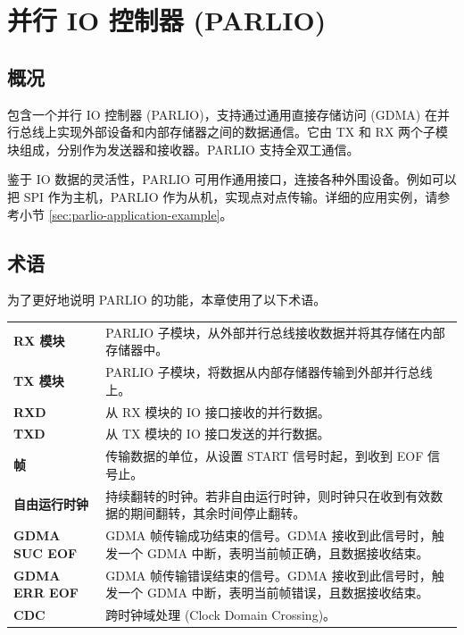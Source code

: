 \documentclass[main\_\_CN.tex]{subfiles}
\begin{document}

\ifglobal
\else
    {\let\clearpage\relax \listoftodos}
    {\let\clearpage\relax \listofdonetodos}
    \tableofcontents
\fi



\hypertarget{parlio}{}
\chapter{并行 IO 控制器 (PARLIO)}
\label{mod:parlio}



\section{概况}

\chipname{} 包含一个并行 IO 控制器 (PARLIO)，支持通过通用直接存储访问 (GDMA) 在并行总线上实现外部设备和内部存储器之间的数据通信。它由 TX 和 RX 两个子模块组成，分别作为发送器和接收器。PARLIO 支持全双工通信。

鉴于 IO 数据的灵活性，PARLIO 可用作通用接口，连接各种外围设备。例如可以把 SPI 作为主机，PARLIO 作为从机，实现点对点传输。详细的应用实例，请参考小节 \ref{sec:parlio-application-example}。

\section{术语}

为了更好地说明 PARLIO 的功能，本章使用了以下术语。

\begin{longtable}[c]{ R{4cm} p{10cm} }
\textbf{RX 模块}      & PARLIO 子模块，从外部并行总线接收数据并将其存储在内部存储器中。 \\
\textbf{TX 模块}      & PARLIO 子模块，将数据从内部存储器传输到外部并行总线上。 \\
\textbf{RXD}          & 从 RX 模块的 IO 接口接收的并行数据。 \\
\textbf{TXD}          & 从 TX 模块的 IO 接口发送的并行数据。  \\
\textbf{帧}           & 传输数据的单位，从设置 START 信号时起，到收到 EOF 信号止。 \\
\textbf{自由运行时钟} & 持续翻转的时钟。若非自由运行时钟，则时钟只在收到有效数据的期间翻转，其余时间停止翻转。\\
\textbf{GDMA SUC EOF} & GDMA 帧传输成功结束的信号。GDMA 接收到此信号时，触发一个 GDMA 中断，表明当前帧正确，且数据接收结束。 \\
\textbf{GDMA ERR EOF} & GDMA 帧传输错误结束的信号。GDMA 接收到此信号时，触发一个 GDMA 中断，表明当前帧错误，且数据接收结束。 \\
\textbf{CDC}          & 跨时钟域处理 (Clock Domain Crossing)。 \\

\end{longtable}
\end{document}
